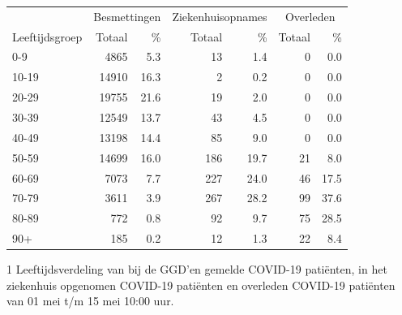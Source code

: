 \documentclass[
  english,
  man,floatsintext]{apa6}
\begin{document}
\begin{table}
\centering\begingroup\fontsize{11}{13}\selectfont

\begin{threeparttable}
\begin{tabular}{lrrrrrr}
\toprule
\multicolumn{1}{c}{ } & \multicolumn{2}{c}{Besmettingen} & \multicolumn{2}{c}{Ziekenhuisopnames} & \multicolumn{2}{c}{Overleden} \\
\cmidrule(l{3pt}r{3pt}){2-3} \cmidrule(l{3pt}r{3pt}){4-5} \cmidrule(l{3pt}r{3pt}){6-7}
Leeftijdsgroep & Totaal & \% & Totaal & \% & Totaal & \%\\
\midrule
0-9 & 4865 & 5.3 & 13 & 1.4 & 0 & 0.0\\
10-19 & 14910 & 16.3 & 2 & 0.2 & 0 & 0.0\\
20-29 & 19755 & 21.6 & 19 & 2.0 & 0 & 0.0\\
30-39 & 12549 & 13.7 & 43 & 4.5 & 0 & 0.0\\
40-49 & 13198 & 14.4 & 85 & 9.0 & 0 & 0.0\\
50-59 & 14699 & 16.0 & 186 & 19.7 & 21 & 8.0\\
60-69 & 7073 & 7.7 & 227 & 24.0 & 46 & 17.5\\
70-79 & 3611 & 3.9 & 267 & 28.2 & 99 & 37.6\\
80-89 & 772 & 0.8 & 92 & 9.7 & 75 & 28.5\\
90+ & 185 & 0.2 & 12 & 1.3 & 22 & 8.4\\
\bottomrule
\end{tabular}
\begin{tablenotes}
\item[1] Leeftijdsverdeling van bij de GGD’en gemelde COVID-19 patiënten, in het ziekenhuis opgenomen COVID-19 patiënten en overleden COVID-19 patiënten van 01 mei t/m 15 mei 10:00 uur.
\end{tablenotes}
\end{threeparttable}
\endgroup{}
\end{table}

\newpage
\end{document}
